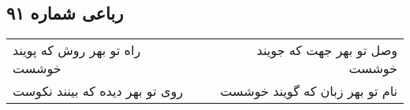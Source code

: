 \begin{center}
\section*{رباعی شماره ۹۱}
\label{sec:sh091}
\begin{longtable}{l p{0.5cm} r}
راه تو بهر روش که پویند خوشست
&&
وصل تو بهر جهت که جویند خوشست
\\
روی تو بهر دیده که بینند نکوست
&&
نام تو بهر زبان که گویند خوشست
\\
\end{longtable}
\end{center}
